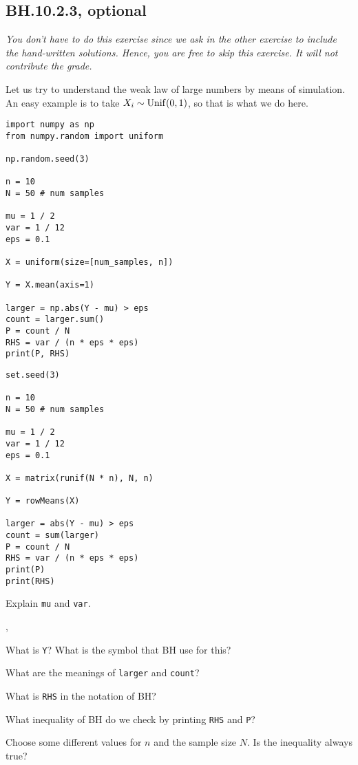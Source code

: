 


\subsection{BH.10.2.3, optional}


\emph{You don't have to do this exercise since we ask in the other exercise to include the hand-written solutions. Hence, you are free to skip this exercise. It will not contribute the grade.}



Let us try to understand the weak law of large numbers by means of simulation. An easy example is to take $X_{i}\sim\mathrm{Unif}(0,1)$, so that is what we do here.

\begin{verbatim}
import numpy as np
from numpy.random import uniform

np.random.seed(3)

n = 10
N = 50 # num samples

mu = 1 / 2
var = 1 / 12
eps = 0.1

X = uniform(size=[num_samples, n])

Y = X.mean(axis=1)

larger = np.abs(Y - mu) > eps
count = larger.sum()
P = count / N
RHS = var / (n * eps * eps)
print(P, RHS)
\end{verbatim}

\begin{verbatim}
set.seed(3)

n = 10
N = 50 # num samples

mu = 1 / 2
var = 1 / 12
eps = 0.1

X = matrix(runif(N * n), N, n)

Y = rowMeans(X)

larger = abs(Y - mu) > eps
count = sum(larger)
P = count / N
RHS = var / (n * eps * eps)
print(P)
print(RHS)
\end{verbatim}


\begin{exercise}
Explain \texttt{mu} and \texttt{var}.
\end{exercise}
,
\begin{exercise}
What is \texttt{Y}? What is the symbol that BH use for this?
\end{exercise}

\begin{exercise}
What are the meanings of \texttt{larger} and \texttt{count}?
\end{exercise}

\begin{exercise}
What is \texttt{RHS} in the notation of BH?
\end{exercise}

\begin{exercise}
What inequality of BH do we check by printing \texttt{RHS}  and \texttt{P}?
\end{exercise}

\begin{exercise}
Choose some different values for $n$ and the sample size $N$. Is the inequality always true?
\end{exercise}


